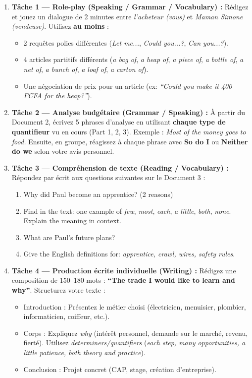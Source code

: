 \documentclass[11pt]{article}
\begin{document}
\begin{enumerate}
    \item \textbf{Tâche 1 — Role-play (Speaking / Grammar / Vocabulary) :} Rédigez et jouez un dialogue de 2 minutes entre \emph{l'acheteur (vous)} et \emph{Maman Simone (vendeuse)}. Utilisez \textbf{au moins} :
    \begin{itemize}
        \item 2 requêtes polies différentes (\emph{Let me...}, \emph{Could you...?}, \emph{Can you...?}).
        \item 4 articles partitifs différents (\emph{a bag of}, \emph{a heap of}, \emph{a piece of}, \emph{a bottle of}, \emph{a net of}, \emph{a bunch of}, \emph{a loaf of}, \emph{a carton of}).
        \item Une négociation de prix pour un article (ex: \emph{``Could you make it 400 FCFA for the heap?''}).
    \end{itemize}
    
    \item \textbf{Tâche 2 — Analyse budgétaire (Grammar / Speaking) :} À partir du Document 2, écrivez 5 phrases d'analyse en utilisant \textbf{chaque type de quantifieur} vu en cours (Part 1, 2, 3). Exemple : \emph{Most of the money goes to food.} Ensuite, en groupe, réagissez à chaque phrase avec \textbf{So do I} ou \textbf{Neither do we} selon votre avis personnel.
    
    \item \textbf{Tâche 3 — Compréhension de texte (Reading / Vocabulary) :} Répondez par écrit aux questions suivantes sur le Document 3 :
    \begin{enumerate}
        \item Why did Paul become an apprentice? (2 reasons)
        \item Find in the text: one example of \emph{few}, \emph{most}, \emph{each}, \emph{a little}, \emph{both}, \emph{none}. Explain the meaning in context.
        \item What are Paul's future plans?
        \item Give the English definitions for: \emph{apprentice, crawl, wires, safety rules}.
    \end{enumerate}
    
    \item \textbf{Tâche 4 — Production écrite individuelle (Writing) :} Rédigez une composition de 150--180 mots : \textbf{``The trade I would like to learn and why''}. Structurez votre texte :
    \begin{itemize}
        \item Introduction : Présentez le métier choisi (électricien, menuisier, plombier, informaticien, coiffeur, etc.).
        \item Corps : Expliquez \emph{why} (intérêt personnel, demande sur le marché, revenu, fierté). Utilisez \emph{determiners/quantifiers} (\emph{each step, many opportunities, a little patience, both theory and practice}).
        \item Conclusion : Projet concret (CAP, stage, création d'entreprise).
    \end{itemize}
\end{enumerate}
\end{document}
